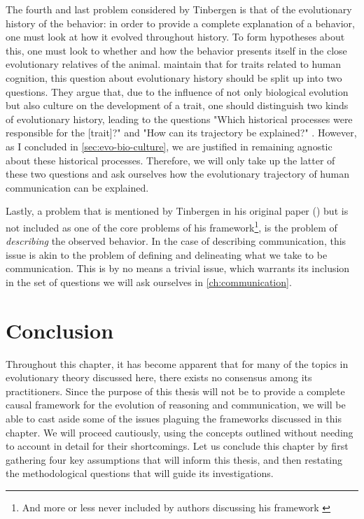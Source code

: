 The fourth and last problem considered by Tinbergen is that of the evolutionary history of the behavior: in order to provide a complete explanation of a behavior, one must look at how it evolved throughout history. To form hypotheses about this, one must look to whether and how the behavior presents itself in the close evolutionary relatives of the animal.
\citet{BatesonLaland13} maintain that for traits related to human cognition, this question about evolutionary history should be split up into two questions. They argue that, due to the influence of not only biological evolution but also culture on the development of a trait, one should distinguish two kinds of evolutionary history, leading to the questions "Which historical processes were responsible for the [trait]?" and "How can its trajectory be explained?" \citep[p.~714]{BatesonLaland13}. However, as I concluded in \cref{sec:evo-bio-culture}, we are justified in remaining agnostic about these historical processes. Therefore, we will only take up the latter of these two questions and ask ourselves how the evolutionary trajectory of human communication can be explained.

Lastly, a problem that is mentioned by Tinbergen in his original paper (\citeyear{Tinbergen63}) but is not included as one of the core problems of his framework\footnote{And more or less never included by authors discussing his framework \citep{LB02, Laland13, AllenBekoff95}}, is the problem of \emph{describing} the observed behavior.
In the case of describing communication, this issue is akin to the problem of defining and delineating what we take to be communication. This is by no means a trivial issue, which warrants its inclusion in the set of questions we will ask ourselves in \cref{ch:communication}.

\section{Conclusion}
\label{sec:evo-conclusion}
Throughout this chapter, it has become apparent that for many of the topics in evolutionary theory discussed here, there exists no consensus among its practitioners. Since the purpose of this thesis will not be to provide a complete causal framework for the evolution of reasoning and communication, we will be able to cast aside some of the issues plaguing the frameworks discussed in this chapter. We will proceed cautiously, using the concepts outlined without needing to account in detail for their shortcomings.
Let us conclude this chapter by first gathering four key assumptions that will inform this thesis, and then restating the methodological questions that will guide its investigations.

